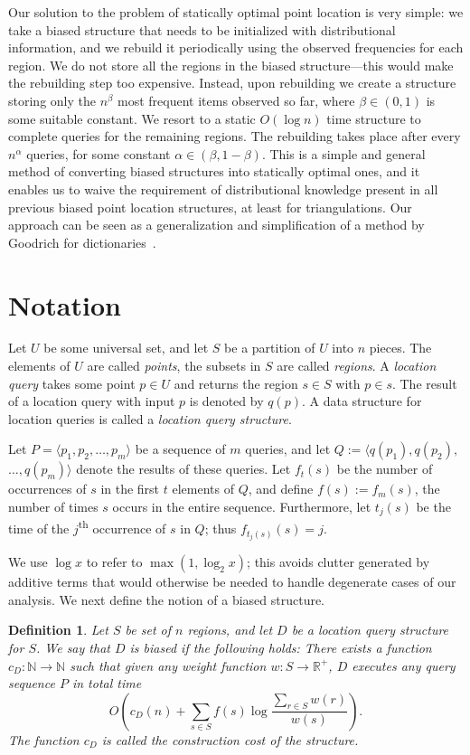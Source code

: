 \documentclass[11pt]{article}
\newtheorem{definition}[figure]{Definition}
\newcommand{\eqdef}{:=}
\begin{document}
Our solution to the problem of statically optimal point location is
very simple: we take a biased structure that needs to be initialized with
distributional information, and we rebuild it periodically using the observed
frequencies for each region. We do not store all the regions in the biased
structure---this would make the rebuilding step too expensive.
Instead, upon rebuilding we create a structure storing only the $n^\beta$ most
frequent items observed so far,
where $\beta \in (0,1)$ is some suitable constant.
We resort to a static
$O(\log n)$ time structure to
complete queries for the remaining regions.
 The rebuilding takes place after every $n^\alpha$ queries, for some constant
$\alpha \in (\beta,1-\beta)$.
This is a
simple and general method of converting biased structures into statically
optimal ones, and it enables us to waive the requirement of
distributional knowledge present in all previous biased point location
structures, at least for triangulations.
Our approach can be seen as a generalization and simplification of a method
by Goodrich for dictionaries~\cite{Goodrich00}.

\section{Notation}
Let $U$ be some universal set, and let $S$ be a
partition of $U$ into $n$ pieces. The elements
of $U$ are called \emph{points}, the subsets in $S$ are called \emph{regions}.
A \emph{location query} takes some point $p \in U$ and
returns the region $s \in S$ with $p \in s$. The result
of a location query with input $p$ is denoted by $q(p)$.
A data structure for location queries is called a \emph{location
query structure}. 

Let $P=\langle p_1, p_2, \dots , p_m \rangle$ 
be a sequence of $m$ queries, and 
let $Q \eqdef \langle q(p_1), q(p_2),$ $\dots, q(p_m) \rangle$ 
denote the results of these queries.
Let $f_t(s)$ be the number of occurrences of $s$ in the first $t$ elements
of $Q$, and define $f(s) \eqdef f_m(s)$, the number of
times $s$ occurs in the entire sequence. Furthermore, let $t_j(s)$ be
the time of the $j$\textsuperscript{th} occurrence of $s$ in $Q$; 
thus $f_{t_j(s)}(s)=j$.

We use $\log x$ to refer to $\max (1,\log_2 x)$; this avoids clutter generated 
by additive terms that would otherwise be needed to handle degenerate cases 
of our analysis.
We next define the notion of a biased  structure.
\begin{definition} 
Let $S$ be set of $n$ regions, 
and let $D$ be a location query structure for $S$.
We say that $D$ is \emph{biased} if the following holds: There
exists a function $c_D : \mathbb{N} \rightarrow \mathbb{N}$ such that
given any weight function $w : S \rightarrow \mathbb{R}^+$,
$D$ executes any query sequence $P$ in total time
\[ 
O\left( c_D(n)+ \sum_{s \in S} f(s) \log \frac{\sum_{r \in S} w(r)}{w(s)}
\right).
\]
The function $c_D$ is called the \emph{construction cost} of the
structure.  
\end{definition}
\end{document}
